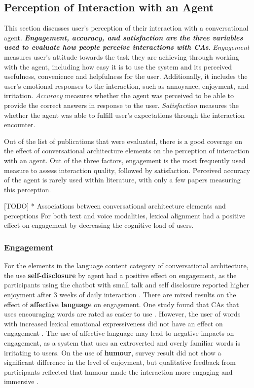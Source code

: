 \subsection{Perception of Interaction with an Agent}

This section discusses user's perception of their interaction with a conversational agent. \textbf{\textit{Engagement, accuracy, and satisfaction are the three variables used to evaluate how people perceive interactions with CAs}}. \textit{Engagement} measures user's attitude towards the task they are achieving through working with the agent, including how easy it is to use the system and its perceived usefulness, convenience and helpfulness for the user. Additionally, it includes the user's emotional responses to the interaction, such as annoyance, enjoyment, and irritation. \textit{Accuracy} measures whether the agent was perceived to be able to provide the correct answers in response to the user. \textit{Satisfaction} measures the whether the agent was able to fulfill user's expectations through the interaction encounter.

Out of the list of publications that were evaluated, there is a good coverage on the effect of conversational architecture elements on the perception of interaction with an agent. Out of the three factors, engagement is the most frequently used measure to assess interaction quality, followed by satisfaction. Perceived accuracy of the agent is rarely used within literature, with only a few papers measuring this perception. 

[TODO] * Associations between conversational architecture elements and perceptions
For both text and voice modalities, lexical alignment had a positive effect on engagement by decreasing the cognitive load of users. 

\subsubsection{Engagement}
For the elements in the language content category of conversational architecture, the use \textbf{self-disclosure} by agent had a positive effect on engagement, as the participants using the chatbot with small talk and self disclosure reported higher enjoyment after 3 weeks of daily interaction \cite{lee2020hear}\cmt{[23]}. There are mixed results on the effect of \textbf{affective language} on engagement. One study found that CAs that uses encouraging words are rated as easier to use \cite{healey2013relating}\cmt{[39]}. However, the user of words with increased lexical emotional expressiveness did not have an effect on engagement \cite{zhu2022effects}\cmt{[26]}. The use of affective language may lead to negative impacts on engagement, as a system that uses an extroverted and overly familiar words is irritating to users. On the use of \textbf{humour}, survey result did not show a significant difference in the level of enjoyment, but qualitative feedback from participants reflected that humour made the interaction more engaging and immersive \cite{ceha2021can}\cmt{[57]}.

